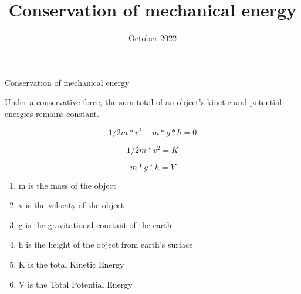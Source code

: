 \documentclass{article}
\title{Conservation of mechanical energy}
\date{October 2022}
\begin{document}
\begin{center}
    Conservation of mechanical energy
\end{center}

\begin{flushleft}
    Under a conservative force, the sum total of an object’s kinetic and potential energies remains constant.
\end{flushleft}
\begin{equation}
    1/2m*v^2 + m*g*h =0
\end{equation}

\begin{equation}
    1/2m*v^2 = K
\end{equation}

\begin{equation}
    m*g*h = V
\end{equation} 

\begin{enumerate}[a]
    \item m is the mass of the object
    \item v is the velocity of the object
    \item g is the gravitational constant of the earth  
    \item h is the height of the object from earth’s surface
    \item K is the total Kinetic Energy
    \item V is the Total  Potential Energy
    
\end{enumerate}
\end{document}
